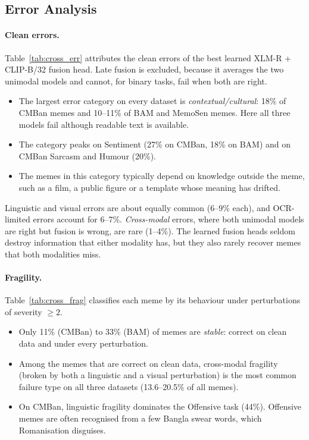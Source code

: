 \subsection{Error Analysis}
\label{sec:results:errors}




\paragraph{Clean errors.} Table~\ref{tab:cross_err} attributes the clean errors of the best learned XLM-R +
CLIP-B/32 fusion head. Late fusion is excluded, because it averages the two unimodal models and cannot, for binary
tasks, fail when both are right.
\begin{itemize}
  \item The largest error category on every dataset is \emph{contextual/cultural}: 18\% of CMBan memes and 10--11\%
  of BAM and MemoSen memes. Here all three models fail although readable text is available.
  \item The category peaks on Sentiment (27\% on CMBan, 18\% on BAM) and on CMBan Sarcasm and Humour (20\%).
  \item The memes in this category typically depend on knowledge outside the meme, such as a film, a public figure
  or a template whose meaning has drifted.
\end{itemize}
Linguistic and visual errors are about equally common (6--9\% each), and OCR-limited errors account for 6--7\%.
\emph{Cross-modal} errors, where both unimodal models are right but fusion is wrong, are rare (1--4\%). The learned
fusion heads seldom destroy information that either modality has, but they also rarely recover memes that both
modalities miss.

\paragraph{Fragility.} Table~\ref{tab:cross_frag} classifies each meme by its behaviour under perturbations of
severity $\geq2$.
\begin{itemize}
  \item Only 11\% (CMBan) to 33\% (BAM) of memes are \emph{stable}: correct on clean data and under every
  perturbation.
  \item Among the memes that are correct on clean data, cross-modal fragility (broken by both a linguistic and a
  visual perturbation) is the most common failure type on all three datasets (13.6--20.5\% of all memes).
  \item On CMBan, linguistic fragility dominates the Offensive task (44\%). Offensive memes are often recognised from
  a few Bangla swear words, which Romanisation disguises.
\end{itemize}
